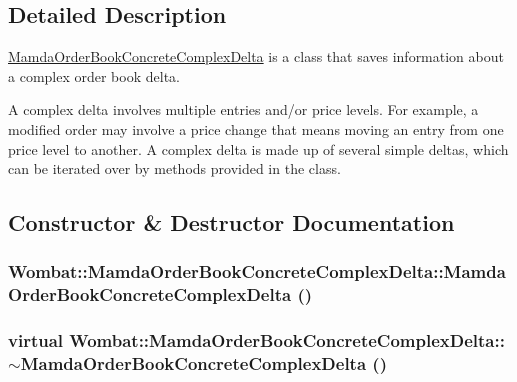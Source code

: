 \subsection{Detailed Description}
\hyperlink{classWombat_1_1MamdaOrderBookConcreteComplexDelta}{Mamda\-Order\-Book\-Concrete\-Complex\-Delta} is a class that saves information about a complex order book delta. 

A complex delta involves multiple entries and/or price levels. For example, a modified order may involve a price change that means moving an entry from one price level to another. A complex delta is made up of several simple deltas, which can be iterated over by methods provided in the class. 



\subsection{Constructor \& Destructor Documentation}
\hypertarget{classWombat_1_1MamdaOrderBookConcreteComplexDelta_14e5fc572ff97295c8e2920b462e1795}{
\subsubsection[MamdaOrderBookConcreteComplexDelta]{\setlength{\rightskip}{0pt plus 5cm}Wombat::Mamda\-Order\-Book\-Concrete\-Complex\-Delta::Mamda\-Order\-Book\-Concrete\-Complex\-Delta ()}}
\label{classWombat_1_1MamdaOrderBookConcreteComplexDelta_14e5fc572ff97295c8e2920b462e1795}


\hypertarget{classWombat_1_1MamdaOrderBookConcreteComplexDelta_6d538d139930e7e9d238f82f9e0e63a4}{
\subsubsection[$\sim$MamdaOrderBookConcreteComplexDelta]{\setlength{\rightskip}{0pt plus 5cm}virtual Wombat::Mamda\-Order\-Book\-Concrete\-Complex\-Delta::$\sim$Mamda\-Order\-Book\-Concrete\-Complex\-Delta ()}}
\label{classWombat_1_1MamdaOrderBookConcreteComplexDelta_6d538d139930e7e9d238f82f9e0e63a4}




